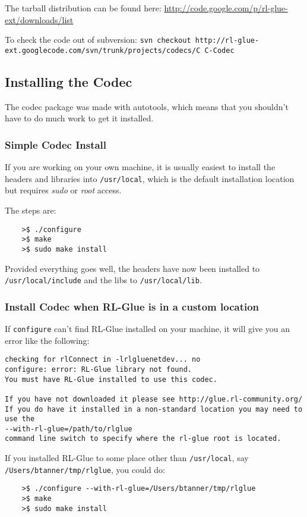 \documentclass[11pt]{article}
\begin{document}
The tarball distribution can be found here:\newline
\url{http://code.google.com/p/rl-glue-ext/downloads/list}


To check the code out of subversion:\newline
\texttt{svn checkout http://rl-glue-ext.googlecode.com/svn/trunk/projects/codecs/C C-Codec}

\subsection{Installing the Codec}
The codec package was made with autotools, which means that you shouldn't have to do much work to get it installed.  

\subsubsection{Simple Codec Install}
If you are working on your own machine, it is usually easiest to install the headers and libraries into \texttt{/usr/local}, which is the default installation location but requires \textit{sudo} or \textit{root} access.

The steps are:
\begin{verbatim}
	>$ ./configure
	>$ make
	>$ sudo make install
\end{verbatim}

Provided everything goes well, the headers have now been installed to \texttt{/usr/local/include} and the libs to \texttt{/usr/local/lib}.

\subsubsection{Install Codec when RL-Glue is in a custom location}

If \texttt{configure} can't find RL-Glue installed on your machine, it will give you an error like the following:
\begin{verbatim}
checking for rlConnect in -lrlgluenetdev... no
configure: error: RL-Glue library not found.
You must have RL-Glue installed to use this codec. 
	
If you have not downloaded it please see http://glue.rl-community.org/
If you do have it installed in a non-standard location you may need to use the 
--with-rl-glue=/path/to/rlglue 
command line switch to specify where the rl-glue root is located.
\end{verbatim}

If you installed RL-Glue to some place other than \texttt{/usr/local}, say \texttt{/Users/btanner/tmp/rlglue}, you could do:
\begin{verbatim}
	>$ ./configure --with-rl-glue=/Users/btanner/tmp/rlglue
	>$ make
	>$ sudo make install
\end{verbatim}
\end{document}
